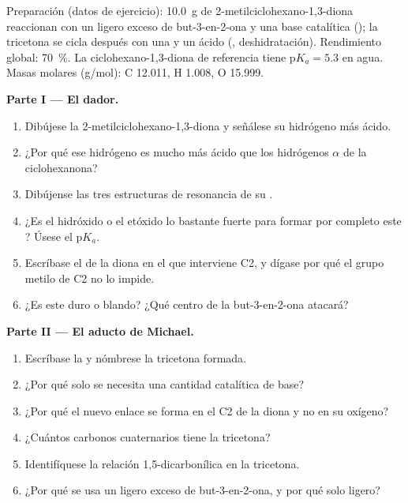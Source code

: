 \begin{problem}
\label{pb:b2:conjugate-additions:1}
Preparación (datos de ejercicio): \qty{10.0}{g} de 2-metilciclohexano-1,3-diona reaccionan con un ligero exceso
de but-3-en-2-ona y una base catalítica (); la tricetona se cicla después con una
 y un ácido (, deshidratación). Rendimiento global: 70~\%. La ciclohexano-1,3-diona de referencia
tiene $\mathrm pK_a = 5.3$ en agua. Masas molares (\unit{g/mol}): C 12.011, H 1.008, O 15.999.

\medskip
\noindent\textbf{Parte I --- El dador.}
\begin{enumerate}
  \item Dibújese la 2-metilciclohexano-1,3-diona y señálese su hidrógeno más ácido.
  \item ¿Por qué ese hidrógeno es mucho más ácido que los hidrógenos $\alpha$ de la ciclohexanona?
  \item Dibújense las tres estructuras de resonancia de su .
  \item ¿Es el hidróxido o el etóxido lo bastante fuerte para formar por completo este ? Úsese el $\mathrm pK_a$.
  \item Escríbase el  de la diona en el que interviene C2, y dígase por qué el grupo metilo de C2 no
        lo impide.
  \item ¿Es este  duro o blando? ¿Qué centro de la but-3-en-2-ona atacará?
\end{enumerate}

\medskip
\noindent\textbf{Parte II --- El aducto de Michael.}
\begin{enumerate}[resume]
  \item Escríbase la  y nómbrese la tricetona formada.
  \item ¿Por qué solo se necesita una cantidad catalítica de base?
  \item ¿Por qué el nuevo enlace se forma en el C2 de la diona y no en su oxígeno?
  \item ¿Cuántos carbonos cuaternarios tiene la tricetona?
  \item Identifíquese la relación 1,5-dicarbonílica en la tricetona.
  \item ¿Por qué se usa un ligero exceso de but-3-en-2-ona, y por qué solo ligero?
\end{enumerate}


\end{problem}

